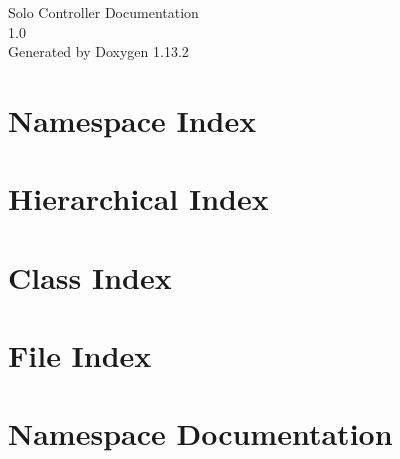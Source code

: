 \documentclass[twoside]{book}
\newcommand{\+}{\discretionary{\mbox{\scriptsize$\hookleftarrow$}}{}{}}
\newcommand{\clearemptydoublepage}{%
    \newpage{\pagestyle{empty}\cleardoublepage}%
  }
\begin{document}
  \raggedbottom
    \hypersetup{pageanchor=false,
                bookmarksnumbered=true,
                pdfencoding=unicode
               }
  \begin{titlepage}
  \vspace*{7cm}
  \begin{center}%
  {\Large Solo Controller Documentation}\\
  [1ex]\large 1.\+0 \\
  \vspace*{1cm}
  {\large Generated by Doxygen 1.13.2}\\
  \end{center}
  \end{titlepage}
  \clearemptydoublepage
  \tableofcontents
  \clearemptydoublepage
  \hypersetup{pageanchor=true}
\chapter{Namespace Index}

\chapter{Hierarchical Index}

\chapter{Class Index}

\chapter{File Index}

\chapter{Namespace Documentation}

















\end{document}
